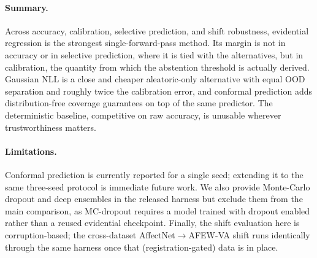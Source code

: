 \paragraph{Summary.} Across accuracy, calibration, selective prediction, and shift
robustness, evidential regression is the strongest single-forward-pass method.
Its margin is not in accuracy or in selective prediction, where it is tied with
the alternatives, but in calibration, the quantity from which the abstention
threshold is actually derived. Gaussian NLL is a close and cheaper aleatoric-only
alternative with equal OOD separation and roughly twice the calibration error, and
conformal prediction adds distribution-free coverage guarantees on top of the same
predictor. The deterministic baseline, competitive on raw accuracy, is unusable
wherever trustworthiness matters.

\paragraph{Limitations.} Conformal prediction is currently reported for a single
seed; extending it to the same three-seed protocol is immediate future work. We
also provide Monte-Carlo dropout and deep ensembles in the released harness but
exclude them from the main comparison, as MC-dropout requires a model trained with
dropout enabled rather than a reused evidential checkpoint. Finally, the shift
evaluation here is corruption-based; the cross-dataset
AffectNet$\rightarrow$AFEW-VA shift runs identically through the same harness once
that (registration-gated) data is in place.
